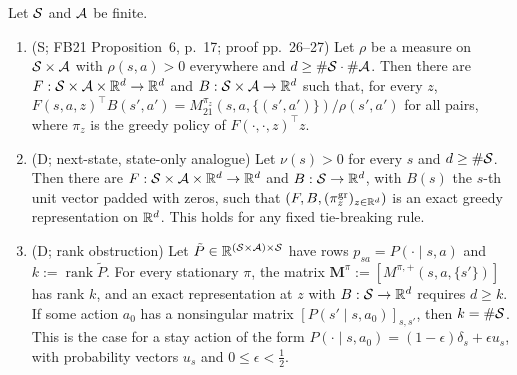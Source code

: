 \begin{proposition}\label{prop:fb-exist}
Let $\mathcal{S}$ and $\mathcal{A}$ be finite.
\begin{enumerate}[nosep,label=(\alph*)]
\item (\textsf{S}; FB21 Proposition~6, p.~17; proof pp.~26--27) Let $\rho$ be a measure on $\mathcal{S}\times\mathcal{A}$ with $\rho(s,a)>0$ everywhere and $d\ge\#\mathcal{S}\cdot\#\mathcal{A}$.
  Then there are $F:\mathcal{S}\times\mathcal{A}\times\mathbb{R}^d\to\mathbb{R}^d$ and $B:\mathcal{S}\times\mathcal{A}\to\mathbb{R}^d$ such that, for every $z$,
  $F(s,a,z)^\top B(s',a')=M^{\pi_z}_{21}(s,a,\{(s',a')\})/\rho(s',a')$ for all pairs, where $\pi_z$ is the greedy policy of $F(\cdot,\cdot,z)^\top z$.
\item (\textsf{D}; next-state, state-only analogue) Let $\nu(s)>0$ for every $s$ and $d\ge\#\mathcal{S}$.
  Then there are $F:\mathcal{S}\times\mathcal{A}\times\mathbb{R}^d\to\mathbb{R}^d$ and $B:\mathcal{S}\to\mathbb{R}^d$, with $B(s)$ the $s$-th unit vector padded with zeros, such that $(F,B,(\pi^{\mathrm{gr}}_z)_{z\in\mathbb{R}^d})$ is an exact greedy representation on $\mathbb{R}^d$.
  This holds for any fixed tie-breaking rule.
\item (\textsf{D}; rank obstruction) Let $\tilde P\in\mathbb{R}^{(\mathcal{S}\times\mathcal{A})\times\mathcal{S}}$ have rows $p_{sa}=P(\cdot\mid s,a)$ and $k:=\operatorname{rank}\tilde P$.
  For every stationary $\pi$, the matrix $\mathbf M^\pi:=[M^{\pi,+}(s,a,\{s'\})]$ has rank $k$, and an exact representation at $z$ with $B:\mathcal{S}\to\mathbb{R}^d$ requires $d\ge k$.
  If some action $a_0$ has a nonsingular matrix $[P(s'\mid s,a_0)]_{s,s'}$, then $k=\#\mathcal{S}$.
  This is the case for a stay action of the form $P(\cdot\mid s,a_0)=(1-\epsilon)\delta_s+\epsilon u_s$, with probability vectors $u_s$ and $0\le\epsilon<\frac12$.
\end{enumerate}
\end{proposition}
